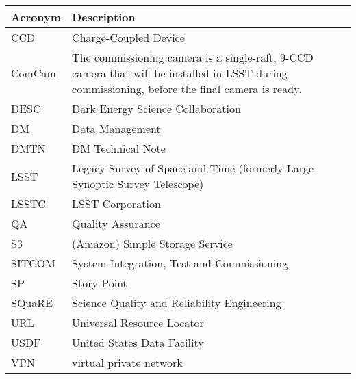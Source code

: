 \addtocounter{table}{-1}
\begin{longtable}{p{}p{}}\hline
\textbf{Acronym} & \textbf{Description}  \\\hline

CCD & Charge-Coupled Device \\\hline
ComCam & The commissioning camera is a single-raft, 9-CCD camera that will be installed in LSST during commissioning, before the final camera is ready. \\\hline
DESC & Dark Energy Science Collaboration \\\hline
DM & Data Management \\\hline
DMTN & DM Technical Note \\\hline
LSST & Legacy Survey of Space and Time (formerly Large Synoptic Survey Telescope) \\\hline
LSSTC & LSST Corporation \\\hline
QA & Quality Assurance \\\hline
S3 & (Amazon) Simple Storage Service  \\\hline
SITCOM & System Integration, Test and Commissioning \\\hline
SP & Story Point \\\hline
SQuaRE & Science Quality and Reliability Engineering \\\hline
URL & Universal Resource Locator \\\hline
USDF & United States Data Facility \\\hline
VPN & virtual private network \\\hline
\end{longtable}
